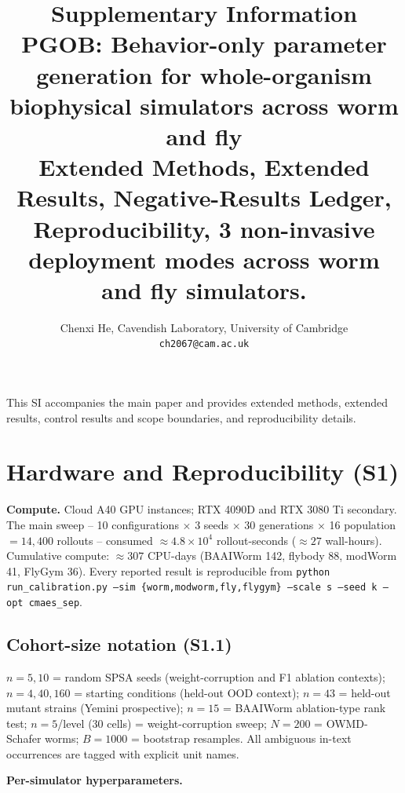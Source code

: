 \documentclass[11pt]{article}
\title{Supplementary Information \\ \large \textbf{PGOB: Behavior-only parameter generation for whole-organism biophysical simulators across worm and fly} \\ \large Extended Methods, Extended Results, Negative-Results Ledger, Reproducibility, 3 non-invasive deployment modes across worm and fly simulators.}
\author{Chenxi He, Cavendish Laboratory, University of Cambridge \\ \texttt{ch2067@cam.ac.uk}}
\begin{document}
\maketitle
\tableofcontents

This SI accompanies the main paper and provides extended methods, extended results, control results and scope boundaries, and reproducibility details.

\section{Hardware and Reproducibility (S1)}
\label{si:hardware}

\textbf{Compute.} Cloud A40 GPU instances; RTX 4090D and RTX 3080 Ti secondary. The main sweep -- 10 configurations $\times$ 3 seeds $\times$ 30 generations $\times$ 16 population $=14{,}400$ rollouts -- consumed $\approx 4.8\times 10^4$ rollout-seconds ($\approx 27$ wall-hours). Cumulative compute: $\approx 307$ CPU-days (BAAIWorm 142, flybody 88, modWorm 41, FlyGym 36). Every reported result is reproducible from \texttt{python run\_calibration.py --sim \{worm,modworm,fly,flygym\} --scale s --seed k --opt cmaes\_sep}.

\subsection{Cohort-size notation (S1.1)}
$n{=}5,10$ = random SPSA seeds (weight-corruption and F1 ablation contexts); $n{=}4,40,160$ = starting conditions (held-out OOD context); $n{=}43$ = held-out mutant strains (Yemini prospective); $n{=}15$ = BAAIWorm ablation-type rank test; $n{=}5$/level ($30$ cells) = weight-corruption sweep; $N{=}200$ = OWMD-Schafer worms; $B{=}1000$ = bootstrap resamples. All ambiguous in-text occurrences are tagged with explicit unit names.

\textbf{Per-simulator hyperparameters.}
\end{document}
